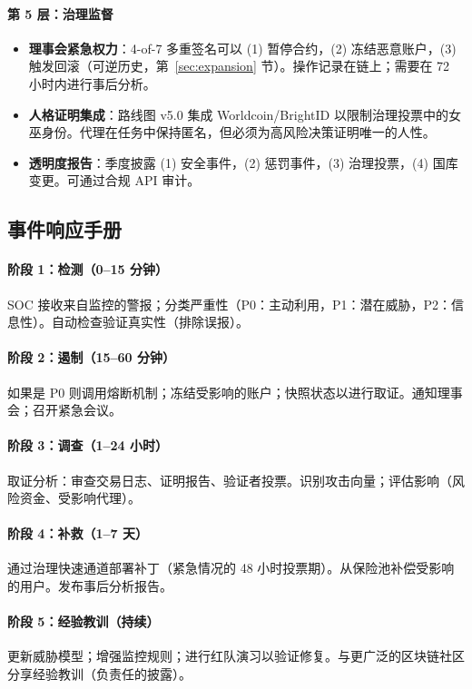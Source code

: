 \documentclass[11pt]{article}
\begin{document}
\paragraph{第 5 层：治理监督}
\begin{itemize}[noitemsep]
  \item \textbf{理事会紧急权力}：4-of-7 多重签名可以 (1) 暂停合约，(2) 冻结恶意账户，(3) 触发回滚（可逆历史，第~\ref{sec:expansion} 节）。操作记录在链上；需要在 72 小时内进行事后分析。
  \item \textbf{人格证明集成}：路线图 v5.0 集成 Worldcoin/BrightID 以限制治理投票中的女巫身份。代理在任务中保持匿名，但必须为高风险决策证明唯一的人性。
  \item \textbf{透明度报告}：季度披露 (1) 安全事件，(2) 惩罚事件，(3) 治理投票，(4) 国库变更。可通过合规 API 审计。
\end{itemize}

\subsection{事件响应手册}

\paragraph{阶段 1：检测（0--15 分钟）}
SOC 接收来自监控的警报；分类严重性（P0：主动利用，P1：潜在威胁，P2：信息性）。自动检查验证真实性（排除误报）。

\paragraph{阶段 2：遏制（15--60 分钟）}
如果是 P0 则调用熔断机制；冻结受影响的账户；快照状态以进行取证。通知理事会；召开紧急会议。

\paragraph{阶段 3：调查（1--24 小时）}
取证分析：审查交易日志、证明报告、验证者投票。识别攻击向量；评估影响（风险资金、受影响代理）。

\paragraph{阶段 4：补救（1--7 天）}
通过治理快速通道部署补丁（紧急情况的 48 小时投票期）。从保险池补偿受影响的用户。发布事后分析报告。

\paragraph{阶段 5：经验教训（持续）}
更新威胁模型；增强监控规则；进行红队演习以验证修复。与更广泛的区块链社区分享经验教训（负责任的披露）。
\end{document}
